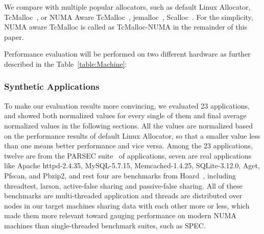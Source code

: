 \label{sec:performance}


We compare \NM{} with multiple popular allocators, such as default Linux Allocator, TcMalloc~\cite{tcmalloc}, or NUMA Aware TcMalloc~\cite{tcmallocnew}, jemalloc~\cite{jemalloc}, Scalloc~\cite{Scalloc}. For the simplicity, NUMA aware TcMalloc is called as TcMalloc-NUMA in the remainder of this paper. 

Performance evaluation will be performed on two different hardware as further described in the Table~\ref{table:Machine}:









\subsubsection{Synthetic Applications}
\label{sec:synthetic}

To make our evaluation results more convincing, we evaluated 23 applications, and showed both normalized values for every single of them and final average normalized values in the following sections. All the values are normalized based on the performance results of default Linux Allocator, so that a smaller value less than one means better performance and vice versa. Among the 23 applications, twelve are from the PARSEC suite~\cite{parsec} of applications, seven are real applications like Apache httpd-2.4.35, MySQL-5.7.15, Memcached-1.4.25, SQLite-3.12.0, Aget, Pfscan, and Pbzip2, and rest four are benchmarks from Hoard~\cite{Hoard}, including threadtest, larson, active-false sharing and passive-false sharing. All of these benchmarks are multi-threaded application and threads are distributed over nodes in our target machines sharing data with each other more or less, which made them more relevant toward gauging performance on modern NUMA machines than single-threaded benchmark suites, such as SPEC.

